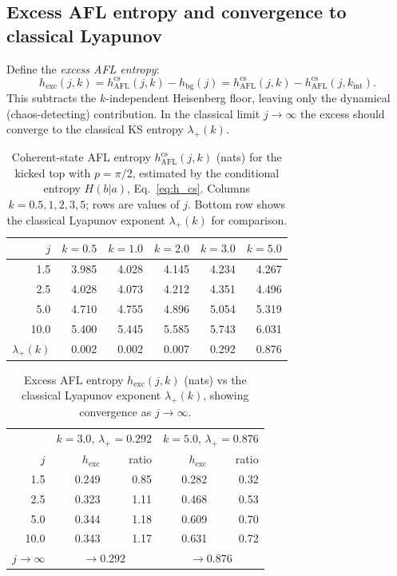 \documentclass[12pt,a4paper]{article}
\begin{document}
\subsection{Excess AFL entropy and convergence to classical Lyapunov}

Define the \emph{excess AFL entropy}:
\begin{equation}
  \label{eq:h_excess}
  h_{\mathrm{exc}}(j,k)
  = h_{\mathrm{AFL}}^{\mathrm{cs}}(j,k) - h_{\mathrm{bg}}(j)
  = h_{\mathrm{AFL}}^{\mathrm{cs}}(j,k) - h_{\mathrm{AFL}}^{\mathrm{cs}}(j,k_{\mathrm{int}}).
\end{equation}
This subtracts the $k$-independent Heisenberg floor, leaving only the
dynamical (chaos-detecting) contribution.  In the classical limit $j\to\infty$
the excess should converge to the classical KS entropy $\lambda_+(k)$.

\begin{table}[h!]
\centering
\caption{Coherent-state AFL entropy $h_{\mathrm{AFL}}^{\mathrm{cs}}(j,k)$ (nats)
for the kicked top with $p=\pi/2$, estimated by the conditional entropy
$H(b|a)$, Eq.~\eqref{eq:h_cs}.  Columns $k=0.5,1,2,3,5$; rows are values of $j$.
Bottom row shows the classical Lyapunov exponent $\lambda_+(k)$ for comparison.}
\label{tab:hcs_main}
\begin{tabular}{r|rrrrr}
\hline
$j$ & $k=0.5$ & $k=1.0$ & $k=2.0$ & $k=3.0$ & $k=5.0$ \\
\hline
1.5  & 3.985 & 4.028 & 4.145 & 4.234 & 4.267 \\
2.5  & 4.028 & 4.073 & 4.212 & 4.351 & 4.496 \\
5.0  & 4.710 & 4.755 & 4.896 & 5.054 & 5.319 \\
10.0 & 5.400 & 5.445 & 5.585 & 5.743 & 6.031 \\
\hline
$\lambda_+(k)$ & 0.002 & 0.002 & 0.007 & 0.292 & 0.876 \\
\hline
\end{tabular}
\end{table}

\begin{table}[h!]
\centering
\caption{Excess AFL entropy $h_{\mathrm{exc}}(j,k)$ (nats) vs the classical
Lyapunov exponent $\lambda_+(k)$, showing convergence as $j\to\infty$.}
\label{tab:h_excess}
\begin{tabular}{r|rr|rr}
\hline
 & \multicolumn{2}{c|}{$k = 3.0$, $\lambda_+ = 0.292$}
 & \multicolumn{2}{c}{$k = 5.0$, $\lambda_+ = 0.876$} \\
$j$ & $h_{\mathrm{exc}}$ & ratio & $h_{\mathrm{exc}}$ & ratio \\
\hline
1.5  & 0.249 & 0.85 & 0.282 & 0.32 \\
2.5  & 0.323 & 1.11 & 0.468 & 0.53 \\
5.0  & 0.344 & 1.18 & 0.609 & 0.70 \\
10.0 & 0.343 & 1.17 & 0.631 & 0.72 \\
\hline
$j\to\infty$ & \multicolumn{2}{c|}{$\to 0.292$} & \multicolumn{2}{c}{$\to 0.876$} \\
\hline
\end{tabular}
\end{table}
\end{document}
